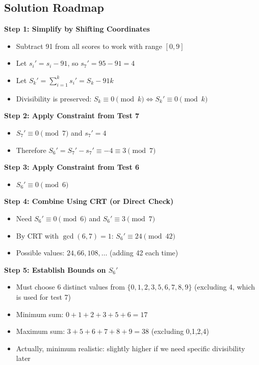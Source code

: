 \documentclass[11pt]{article}
\begin{document}
\begin{solutionbox}
\subsection*{Solution Roadmap}

\textbf{Step 1: Simplify by Shifting Coordinates}
\begin{itemize}
    \item Subtract 91 from all scores to work with range $[0, 9]$
    \item Let $s_i' = s_i - 91$, so $s_7' = 95 - 91 = 4$
    \item Let $S_k' = \sum_{i=1}^{k} s_i' = S_k - 91k$
    \item Divisibility is preserved: $S_k \equiv 0 \pmod{k} \Leftrightarrow S_k' \equiv 0 \pmod{k}$
\end{itemize}

\textbf{Step 2: Apply Constraint from Test 7}
\begin{itemize}
    \item $S_7' \equiv 0 \pmod{7}$ and $s_7' = 4$
    \item Therefore $S_6' = S_7' - s_7' \equiv -4 \equiv 3 \pmod{7}$
\end{itemize}

\textbf{Step 3: Apply Constraint from Test 6}
\begin{itemize}
    \item $S_6' \equiv 0 \pmod{6}$
\end{itemize}

\textbf{Step 4: Combine Using CRT (or Direct Check)}
\begin{itemize}
    \item Need $S_6' \equiv 0 \pmod{6}$ and $S_6' \equiv 3 \pmod{7}$
    \item By CRT with $\gcd(6, 7) = 1$: $S_6' \equiv 24 \pmod{42}$
    \item Possible values: $24, 66, 108, \ldots$ (adding 42 each time)
\end{itemize}

\textbf{Step 5: Establish Bounds on $S_6'$}
\begin{itemize}
    \item Must choose 6 distinct values from $\{0, 1, 2, 3, 5, 6, 7, 8, 9\}$ (excluding 4, which is used for test 7)
    \item Minimum sum: $0+1+2+3+5+6 = 17$
    \item Maximum sum: $3+5+6+7+8+9 = 38$ (excluding 0,1,2,4)
    \item Actually, minimum realistic: slightly higher if we need specific divisibility later
\end{itemize}


\end{solutionbox}
\end{document}
